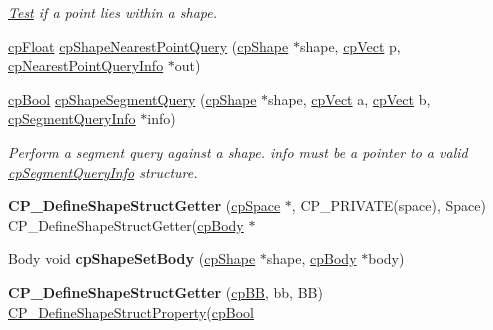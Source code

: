 \begin{DoxyCompactItemize}
\begin{DoxyCompactList}\small\item\em \hyperlink{class_test}{Test} if a point lies within a shape. \end{DoxyCompactList}\item 
\hyperlink{group__basic_types_gac1ed65573e035bf892505768c852d8d3}{cp\-Float} \hyperlink{group__cp_shape_ga101abec1320b0876138aece5d5a4a4e9}{cp\-Shape\-Nearest\-Point\-Query} (\hyperlink{structcp_shape}{cp\-Shape} $\ast$shape, \hyperlink{structcp_vect}{cp\-Vect} p, \hyperlink{structcp_nearest_point_query_info}{cp\-Nearest\-Point\-Query\-Info} $\ast$out)
\item 
\hypertarget{group__cp_shape_ga0e2bfcdf0cb2e44846806b0787b13a3a}{\hyperlink{group__basic_types_gab6e5d8afee598a57cd323abae5310244}{cp\-Bool} \hyperlink{group__cp_shape_ga0e2bfcdf0cb2e44846806b0787b13a3a}{cp\-Shape\-Segment\-Query} (\hyperlink{structcp_shape}{cp\-Shape} $\ast$shape, \hyperlink{structcp_vect}{cp\-Vect} a, \hyperlink{structcp_vect}{cp\-Vect} b, \hyperlink{structcp_segment_query_info}{cp\-Segment\-Query\-Info} $\ast$info)}\label{group__cp_shape_ga0e2bfcdf0cb2e44846806b0787b13a3a}

\begin{DoxyCompactList}\small\item\em Perform a segment query against a shape. {\ttfamily info} must be a pointer to a valid \hyperlink{structcp_segment_query_info}{cp\-Segment\-Query\-Info} structure. \end{DoxyCompactList}\item 
\hypertarget{group__cp_shape_ga565a41ed47d55eabfbd0affbb4ad2eca}{{\bfseries C\-P\-\_\-\-Define\-Shape\-Struct\-Getter} (\hyperlink{structcp_space}{cp\-Space} $\ast$, C\-P\-\_\-\-P\-R\-I\-V\-A\-T\-E(space), Space) C\-P\-\_\-\-Define\-Shape\-Struct\-Getter(\hyperlink{structcp_body}{cp\-Body} $\ast$}\label{group__cp_shape_ga565a41ed47d55eabfbd0affbb4ad2eca}

\item 
\hypertarget{group__cp_shape_gaa5b23915eed04b9100ff446e4413953b}{Body void {\bfseries cp\-Shape\-Set\-Body} (\hyperlink{structcp_shape}{cp\-Shape} $\ast$shape, \hyperlink{structcp_body}{cp\-Body} $\ast$body)}\label{group__cp_shape_gaa5b23915eed04b9100ff446e4413953b}

\item 
\hypertarget{group__cp_shape_ga63ba75243e5e54975bf92d4e7a35115c}{{\bfseries C\-P\-\_\-\-Define\-Shape\-Struct\-Getter} (\hyperlink{structcp_b_b}{cp\-B\-B}, bb, B\-B) \hyperlink{group__cp_shape_ga600318ddce0160e54fd92b6e57662102}{C\-P\-\_\-\-Define\-Shape\-Struct\-Property}(\hyperlink{group__basic_types_gab6e5d8afee598a57cd323abae5310244}{cp\-Bool}}\label{group__cp_shape_ga63ba75243e5e54975bf92d4e7a35115c}


\end{DoxyCompactItemize}
